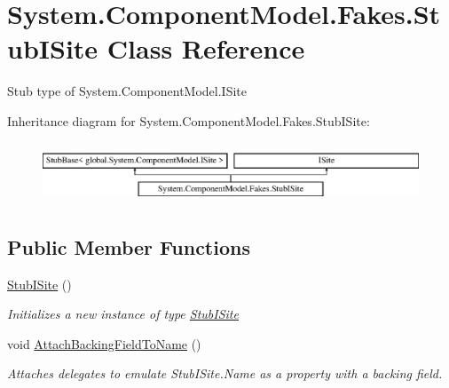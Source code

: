 \hypertarget{class_system_1_1_component_model_1_1_fakes_1_1_stub_i_site}{\section{System.\-Component\-Model.\-Fakes.\-Stub\-I\-Site Class Reference}
\label{class_system_1_1_component_model_1_1_fakes_1_1_stub_i_site}
}


Stub type of System.\-Component\-Model.\-I\-Site 


Inheritance diagram for System.\-Component\-Model.\-Fakes.\-Stub\-I\-Site\-:\begin{figure}[H]
\begin{center}
\leavevmode
\includegraphics[height=1.836066cm]{class_system_1_1_component_model_1_1_fakes_1_1_stub_i_site}
\end{center}
\end{figure}
\subsection*{Public Member Functions}
\begin{DoxyCompactItemize}
\item 
\hyperlink{class_system_1_1_component_model_1_1_fakes_1_1_stub_i_site_ad92e8c6c8c4dca6ec3aabf44b78d2008}{Stub\-I\-Site} ()
\begin{DoxyCompactList}\small\item\em Initializes a new instance of type \hyperlink{class_system_1_1_component_model_1_1_fakes_1_1_stub_i_site}{Stub\-I\-Site}\end{DoxyCompactList}\item 
void \hyperlink{class_system_1_1_component_model_1_1_fakes_1_1_stub_i_site_a3c112282b6158c889cee7fbdb1f7701d}{Attach\-Backing\-Field\-To\-Name} ()
\begin{DoxyCompactList}\small\item\em Attaches delegates to emulate Stub\-I\-Site.\-Name as a property with a backing field.\end{DoxyCompactList}\end{DoxyCompactItemize}

